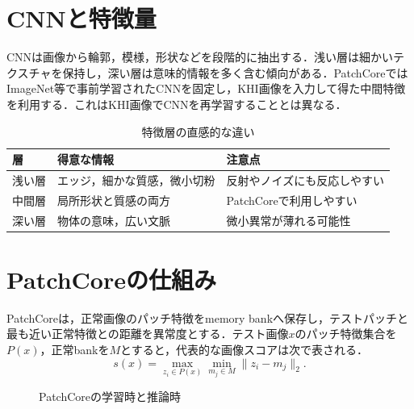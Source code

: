 \documentclass[a4paper,11pt]{ltjsarticle}
\begin{document}
\section{CNNと特徴量}
CNNは画像から輪郭，模様，形状などを段階的に抽出する．浅い層は細かいテクスチャを保持し，深い層は意味的情報を多く含む傾向がある．PatchCoreではImageNet等で事前学習されたCNNを固定し，KHI画像を入力して得た中間特徴を利用する．これはKHI画像でCNNを再学習することとは異なる．

\begin{table}[H]
\centering
\caption{特徴層の直感的な違い}
\begin{tabularx}{\linewidth}{L{27mm}Y Y}
\toprule
層 & 得意な情報 & 注意点 \\
\midrule
浅い層 & エッジ，細かな質感，微小切粉 & 反射やノイズにも反応しやすい \\
中間層 & 局所形状と質感の両方 & PatchCoreで利用しやすい \\
深い層 & 物体の意味，広い文脈 & 微小異常が薄れる可能性 \\
\bottomrule
\end{tabularx}
\end{table}

\section{PatchCoreの仕組み}
PatchCoreは，正常画像のパッチ特徴をmemory bankへ保存し，テストパッチと最も近い正常特徴との距離を異常度とする．テスト画像$x$のパッチ特徴集合を$P(x)$，正常bankを$M$とすると，代表的な画像スコアは次で表される．
\begin{equation}
s(x)=\max_{z_i\in P(x)}\min_{m_j\in M}\lVert z_i-m_j\rVert_2.
\end{equation}

\begin{figure}[H]
\centering
{}
\caption{PatchCoreの学習時と推論時}
\end{figure}
\end{document}
